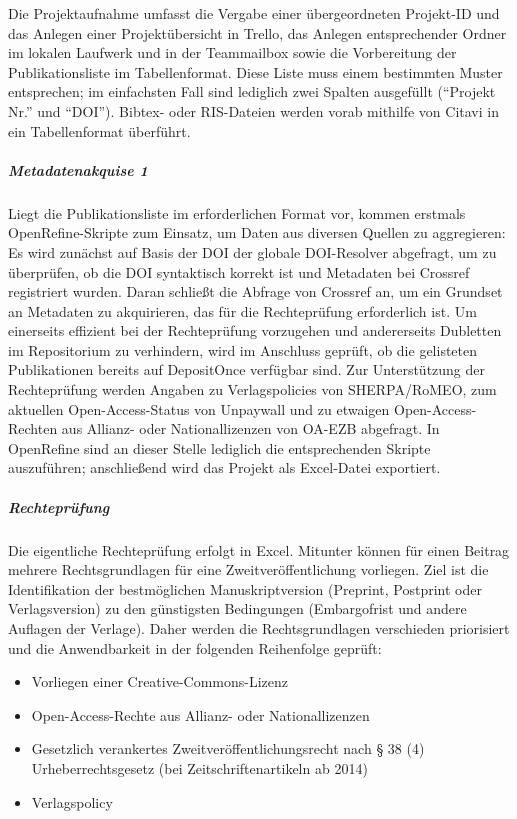 \documentclass[a4paper,
fontsize=11pt,
oneside,
numbers=noperiodatend,
parskip=half-,
bibliography=totoc,
final
]{scrartcl}
\begin{document}
Die Projektaufnahme umfasst die Vergabe einer übergeordneten Projekt-ID
und das Anlegen einer Projektübersicht in Trello, das Anlegen
entsprechender Ordner im lokalen Laufwerk und in der Teammailbox sowie
die Vorbereitung der Publikationsliste im Tabellenformat. Diese Liste
muss einem bestimmten Muster entsprechen; im einfachsten Fall sind
lediglich zwei Spalten ausgefüllt (\enquote{Projekt Nr.} und
\enquote{DOI}). Bibtex- oder RIS-Dateien werden vorab mithilfe von
Citavi in ein Tabellenformat überführt.

\hypertarget{metadatenakquise-1}{%
\subparagraph{Metadatenakquise 1}\label{metadatenakquise-1}}

Liegt die Publikationsliste im erforderlichen Format vor, kommen
erstmals OpenRefine-Skripte zum Einsatz, um Daten aus diversen Quellen
zu aggregieren: Es wird zunächst auf Basis der DOI der globale
DOI-Resolver abgefragt, um zu überprüfen, ob die DOI syntaktisch korrekt
ist und Metadaten bei Crossref registriert wurden. Daran schließt die
Abfrage von Crossref an, um ein Grundset an Metadaten zu akquirieren,
das für die Rechteprüfung erforderlich ist. Um einerseits effizient bei
der Rechteprüfung vorzugehen und andererseits Dubletten im Repositorium
zu verhindern, wird im Anschluss geprüft, ob die gelisteten
Publikationen bereits auf DepositOnce verfügbar sind. Zur Unterstützung
der Rechteprüfung werden Angaben zu Verlagspolicies von SHERPA/RoMEO,
zum aktuellen Open-Access-Status von Unpaywall und zu etwaigen
Open-Access-Rechten aus Allianz- oder Nationallizenzen von OA-EZB
abgefragt. In OpenRefine sind an dieser Stelle lediglich die
entsprechenden Skripte auszuführen; anschließend wird das Projekt als
Excel-Datei exportiert.

\hypertarget{rechtepruxfcfung}{%
\subparagraph{Rechteprüfung}\label{rechtepruxfcfung}}

Die eigentliche Rechteprüfung erfolgt in Excel. Mitunter können für
einen Beitrag mehrere Rechtsgrundlagen für eine Zweitveröffentlichung
vorliegen. Ziel ist die Identifikation der bestmöglichen
Manuskriptversion (Preprint, Postprint oder Verlagsversion) zu den
günstigsten Bedingungen (Embargofrist und andere Auflagen der Verlage).
Daher werden die Rechtsgrundlagen verschieden priorisiert und die
Anwendbarkeit in der folgenden Reihenfolge geprüft:

\begin{itemize}
\item
  Vorliegen einer Creative-Commons-Lizenz
\item
  Open-Access-Rechte aus Allianz- oder Nationallizenzen
\item
  Gesetzlich verankertes Zweitveröffentlichungsrecht nach § 38 (4)
  Urheberrechtsgesetz (bei Zeitschriftenartikeln ab 2014)
\item
  Verlagspolicy
\end{itemize}
\end{document}
